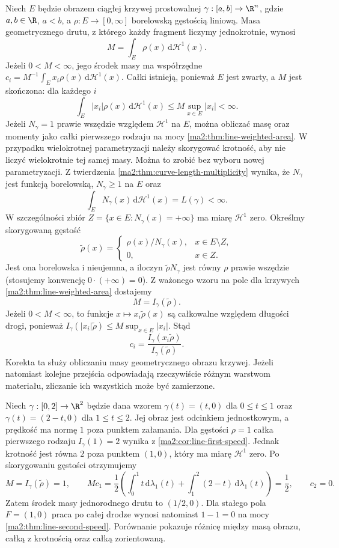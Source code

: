 Niech $E$ będzie obrazem ciągłej
krzywej prostowalnej $\gamma:[a,b]\to\R^n$,
gdzie $a,b\in\R$, $a<b$, a
$\rho:E\to[0,\infty]$ borelowską
gęstością liniową. Masa geometrycznego
drutu, z którego każdy fragment liczymy
jednokrotnie, wynosi
\[
 M=\int_E\rho(x)\,\mathrm d\mathcal H^1(x).
\]
Jeżeli $0<M<\infty$, jego środek masy
ma współrzędne
$c_i=M^{-1}\int_E x_i\rho(x)\,\mathrm d\mathcal H^1(x)$.
Całki istnieją, ponieważ $E$ jest zwarty,
a $M$ jest skończona: dla każdego $i$
\[
 \int_E |x_i|\rho(x)\,\mathrm d\mathcal H^1(x)
 \le M\sup_{x\in E}|x_i|<\infty.
\]
Jeżeli $N_\gamma=1$ prawie wszędzie względem
$\mathcal H^1$ na $E$, można obliczać
masę oraz momenty jako całki pierwszego
rodzaju na mocy \ref{ma2:thm:line-weighted-area}.
W przypadku wielokrotnej parametryzacji
należy skorygować krotność, aby nie
liczyć wielokrotnie tej samej masy.
Można to zrobić bez wyboru nowej parametryzacji.
Z twierdzenia \ref{ma2:thm:curve-length-multiplicity}
wynika, że $N_\gamma$ jest funkcją borelowską,
$N_\gamma\ge1$ na $E$ oraz
\[
 \int_E N_\gamma(x)\,\mathrm d\mathcal H^1(x)
 =L(\gamma)<\infty.
\]
W szczególności zbiór
$Z=\{x\in E:N_\gamma(x)=+\infty\}$
ma miarę $\mathcal H^1$ zero.
Określmy skorygowaną gęstość
\[
 \widetilde\rho(x)=
 \begin{cases}
  \rho(x)/N_\gamma(x),&x\in E\setminus Z,\\
  0,&x\in Z.
 \end{cases}
\]
Jest ona borelowska i nieujemna, a iloczyn
$\widetilde\rho N_\gamma$ jest równy $\rho$
prawie wszędzie (stosujemy konwencję
$0\cdot(+\infty)=0$).
Z ważonego wzoru na pole dla krzywych
\ref{ma2:thm:line-weighted-area} dostajemy
\[
 M=I_\gamma(\widetilde\rho).
\]
Jeżeli $0<M<\infty$, to funkcje
$x\mapsto x_i\widetilde\rho(x)$ są całkowalne
względem długości drogi, ponieważ
$I_\gamma(|x_i|\widetilde\rho)\le
M\sup_{x\in E}|x_i|$. Stąd
\[
 c_i=\frac{I_\gamma(x_i\widetilde\rho)}
 {I_\gamma(\widetilde\rho)}.
\]
Korekta ta służy obliczaniu masy geometrycznego
obrazu krzywej. Jeżeli natomiast kolejne
przejścia odpowiadają rzeczywiście różnym
warstwom materiału, zliczanie ich wszystkich
może być zamierzone.

\begin{przyklad}
\label{ma2:ex:applications-wire-multiplicity}
Niech $\gamma:[0,2]\to\R^2$ będzie dana wzorem
$\gamma(t)=(t,0)$ dla $0\le t\le1$ oraz
$\gamma(t)=(2-t,0)$ dla $1\le t\le2$.
Jej obraz jest odcinkiem jednostkowym, a
prędkość ma normę $1$ poza punktem załamania.
Dla gęstości $\rho=1$ całka pierwszego rodzaju
$I_\gamma(1)=2$ wynika z
\ref{ma2:cor:line-first-speed}.
Jednak krotność jest równa $2$ poza punktem
$(1,0)$, który ma miarę $\mathcal H^1$ zero.
Po skorygowaniu gęstości otrzymujemy
\[
 M=I_\gamma(\widetilde\rho)=1,\qquad
 Mc_1=\frac12\left(
 \int_0^1 t\,\mathrm d\lambda_1(t)
 +\int_1^2(2-t)\,\mathrm d\lambda_1(t)
 \right)=\frac12,
 \qquad c_2=0.
\]
Zatem środek masy jednorodnego drutu to
$(1/2,0)$. Dla stałego pola $F=(1,0)$
praca po całej drodze wynosi natomiast
$1-1=0$ na mocy
\ref{ma2:thm:line-second-speed}.
Porównanie pokazuje różnicę między masą
obrazu, całką z krotnością oraz całką
zorientowaną.
\end{przyklad}

